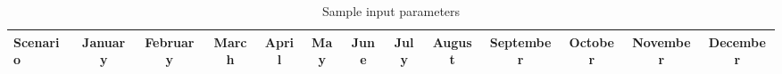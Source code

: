 \begin{table}
\label{tab:Sampleworkability}
\begin{tabular}{lcccccccccccc}
\hline 
Scenario & January & February & March & April  & May & June & July & August & September & October & November & December \\

\hline 
\end{tabular}
\caption{Sample input parameters }
\end{table}